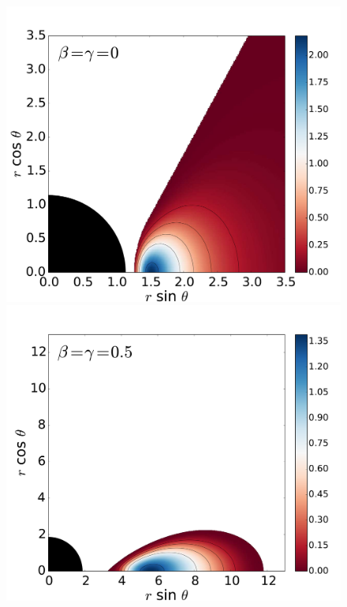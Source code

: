 \documentclass[]{aa}
\begin{document}
\begin{figure}
\includegraphics[scale=0.14]{figures/fig2_1_3.pdf}
\\
\includegraphics[scale=0.14]{figures/fig2_2_1.pdf}
\hspace{-0.3cm}

\end{figure}
\end{document}
